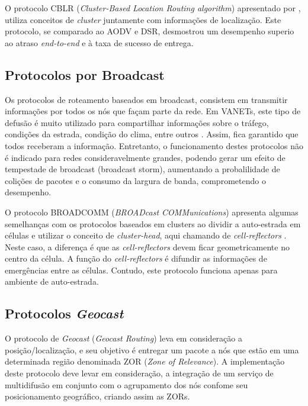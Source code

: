 \documentclass[
	12pt,				%
	oneside,			%
	a4paper,			%
	english,			%
	brazil				%
	]{abntex2ppgsi}
\begin{document}
O protocolo CBLR (\textit{Cluster-Based Location Routing algorithm}) apresentado por  , utiliza conceitos de \textit{cluster} juntamente com informações de localização. Este protocolo, se comparado ao AODV e DSR, desmostrou um desempenho superio ao atraso \textit{end-to-end} e à taxa de sucesso de entrega.


\subsection{Protocolos  por Broadcast}

Os protocolos de roteamento baseados em broadcast, consistem em transmitir informações por todos os nós que façam parte da rede. Em VANETs, este tipo de defusão é muito utilizado para compartilhar informações sobre o tráfego, condições da estrada, condição do clima, entre outros \cite{luis2009melhoria}. Assim,  fica garantido que todos receberam a informação. Entretanto, o funcionamento destes protocolos não é indicado para redes consideravelmente grandes, podendo gerar um efeito de tempestade de broadcast (broadcast storm), aumentando a probalilidade de colições de pacotes e o consumo da largura de banda, comprometendo o desempenho.

O protocolo BROADCOMM (\textit{BROADcast COMMunications}) apresenta algumas semelhanças com os protocolos baseados em clusters ao dividir a auto-estrada em células e utilizar o conceito de \textit{cluster-head}, aqui chamando de \textit{cell-reflectors} \cite{durresi2005emergency}. Neste caso, a diferença é que as \textit{cell-reflectors} devem ficar geometricamente no centro da célula. A função do \textit{cell-reflectors} é difundir as informações de emergências entre as células. Contudo, este protocolo funciona apenas para ambiente de auto-estrada.  

\subsection{Protocolos \textit{Geocast}}

O protocolo de \textit{Geocast} (\textit{Geocast Routing}) leva em consideração a posição/localização, e seu objetivo é entregar um pacote a nós que estão em uma determinada região denominada ZOR (\textit{Zone of Relevance}). A implementação deste protocolo deve levar em consideração, a integração de um serviço de multidifusão em conjunto com o agrupamento dos nós confome seu posicionamento geográfico, criando assim as ZORs.
\end{document}
